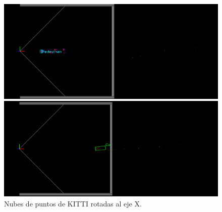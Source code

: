 \begin{figure}[H]
	\begin{minipage}{0.495\textwidth}
		\centering
		\includegraphics[width=1\linewidth]{Book/figures/7_roi/kitti_pcl_rot_0.png}
	\end{minipage}\hfill
	\begin{minipage}{0.495\textwidth}
		\centering
		\includegraphics[width=1\linewidth]{Book/figures/7_roi/kitti_pcl_rot_2.png}
	\end{minipage}
	\caption{Nubes de puntos de KITTI rotadas al eje X.}
	\label{fig:Nubes de puntos de KITTI rotadas al eje X.}
\end{figure}

